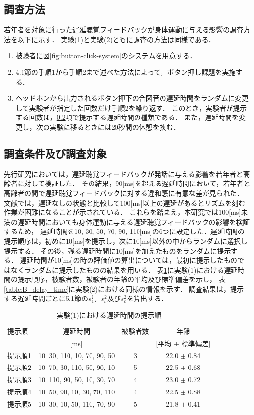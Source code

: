 \subsection{調査方法}
若年者を対象に行った遅延聴覚フィードバックが身体運動に与える影響の調査方法を以下に示す．
実験(1)と実験(2)ともに調査の方法は同様である．
\begin{enumerate}[leftmargin=*]
  \item 被験者に図\ref{fig:button-click-system}のシステムを用意する．
  \item 4.1節の手順1から手順2まで述べた方法によって，ボタン押し課題を実施する．
  \item ヘッドホンから出力されるボタン押下の合図音の遅延時間をランダムに変更して実験者が指定した回数だけ手順2を繰り返す．
  このとき，実験者が提示する回数は，\ref{subsec:Yobi-conditions}項で提示する遅延時間の種類である．
  また，遅延時間を変更し，次の実験に移るときには20秒間の休憩を挟む．
\end{enumerate}
\subsection{調査条件及び調査対象}
\label{subsec:Yobi-conditions}
先行研究\cite{kayama}においては，遅延聴覚フィードバックが発話に与える影響を若年者と高齢者に対して検証した．
その結果，90[ms]を超える遅延時間において，若年者と高齢者の間で遅延聴覚フィードバックに対する違和感に有意な差が見られた．
文献\cite{timing-music}では，遅延なしの状態と比較して100[ms]以上の遅延があるとリズムを刻む作業が困難になることが示されている．
これらを踏まえ，本研究では100[ms]未満の遅延時間においても身体運動に与える遅延聴覚フィードバックの影響を検証するため，
遅延時間を10, 30, 50, 70, 90, 110[ms]の6つに設定した．遅延時間の提示順序は，初めに10[ms]を提示し，次に10[ms]以外の中からランダムに選択し提示する．
その後，残る遅延時間に10[ms]を加えたものをランダムに提示する．
遅延時間が10[ms]の時の評価値の算出については，最初に提示したものではなくランダムに提示したものの結果を用いる．
表\ref{table:A_delay_time}に実験(1)における遅延時間の提示順序，被験者数，被験者の年齢の平均及び標準偏差を示し，
表\ref{table:B_delay_time}に実験(2)における同様の情報を示す．
調査結果は，提示する遅延時間ごとに5.1節の$s^2_{a}$，$s^2_{b}$及び$s^2_{c}$を算出する．
\begin{table}[btp]
  \caption{実験(1)における遅延時間の提示順}
  \label{table:A_delay_time}
  \centering
  \begin{tabular}{lccc}
    \hline
    提示順 & 遅延時間 & 被験者数 & 年齢\\
    　& [ms] & & [平均 $\pm$ 標準偏差]\\
    \hline \hline
    提示順1  & 10, 30, 110, 10, 70, 90, 50  & 3 & 22.0 $\pm$ 0.84\\
    提示順2  & 10, 70, 30, 110, 50, 90, 10  & 5 & 22.5 $\pm$ 0.68\\
    提示順3  & 10, 110, 90, 50, 10, 30, 70  & 4 & 23.0 $\pm$ 0.72\\
    提示順4  & 10, 50, 90, 10, 30, 70, 110  & 4 & 22.5 $\pm$ 0.88\\
    提示順5  & 10, 30, 10, 50, 110, 70, 90  & 5 & 21.8 $\pm$ 0.41
\\
    \hline
  \end{tabular}
\end{table}

